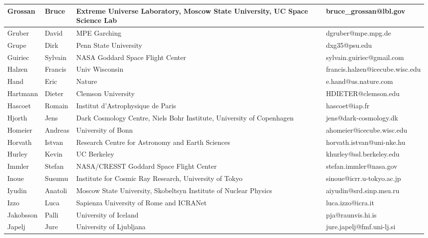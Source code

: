 \begin{center}
\begin{longtable}{|p{1.6cm} |p{1.6cm} |p{2cm} |p{3cm} |}
\tiny Grossan &\tiny Bruce & \tiny Extreme Universe Laboratory, Moscow State University, UC Space Science Lab & \tiny bruce\_grossan@lbl.gov \\ \hline
\tiny Gruber &\tiny David & \tiny MPE Garching & \tiny dgruber@mpe.mpg.de \\ \hline
\tiny Grupe &\tiny Dirk & \tiny Penn State University & \tiny dxg35@psu.edu \\ \hline
\tiny Guiriec &\tiny Sylvain & \tiny NASA Goddard Space Flight Center & \tiny sylvain.guiriec@gmail.com \\ \hline
\tiny Halzen &\tiny Francis & \tiny Univ Wisconsin & \tiny francis.halzen@icecube.wisc.edu \\ \hline
\tiny Hand &\tiny Eric & \tiny Nature & \tiny e.hand@us.nature.com \\ \hline
\tiny Hartmann &\tiny Dieter & \tiny Clemson University & \tiny HDIETER@clemson.edu \\ \hline
\tiny Hascoet &\tiny Romain & \tiny Institut d'Astrophysique de Paris & \tiny hascoet@iap.fr \\ \hline
\tiny Hjorth &\tiny Jens & \tiny Dark Cosmology Centre, Niels Bohr Institute, University of Copenhagen & \tiny jens@dark-cosmology.dk \\ \hline
\tiny Homeier &\tiny Andreas & \tiny University of Bonn & \tiny ahomeier@icecube.wisc.edu \\ \hline
\tiny Horvath &\tiny Istvan & \tiny Research Centre for Astronomy and Earth Sciences & \tiny horvath.istvan@uni-nke.hu \\ \hline
\tiny Hurley &\tiny Kevin & \tiny UC Berkeley & \tiny khurley@ssl.berkeley.edu \\ \hline
\tiny Immler &\tiny Stefan & \tiny NASA/CRESST Goddard Space Flight Center & \tiny stefan.immler@nasa.gov \\ \hline
\tiny Inoue &\tiny Susumu & \tiny Institute for Cosmic Ray Research, University of Tokyo & \tiny sinoue@icrr.u-tokyo.ac.jp \\ \hline
\tiny Iyudin &\tiny Anatoli & \tiny Moscow State University, Skobeltsyn Institute of Nuclear Physics & \tiny aiyudin@srd.sinp.msu.ru \\ \hline
\tiny Izzo &\tiny Luca & \tiny Sapienza University of Rome and ICRANet & \tiny luca.izzo@icra.it \\ \hline
\tiny Jakobsson &\tiny Palli & \tiny University of Iceland & \tiny pja@raunvis.hi.is \\ \hline
\tiny Japelj &\tiny Jure & \tiny University of Ljubljana & \tiny jure.japelj@fmf.uni-lj.si \\ \hline

\end{longtable}
\end{center}
